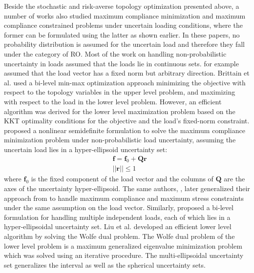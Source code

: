     Beside the stochastic and risk-averse topology optimization presented above, a number of works also studied maximum compliance minimization and maximum compliance constrained problems under uncertain loading conditions, where the former can be formulated using the latter as shown earlier. In these papers, no probability distribution is assumed for the uncertain load and therefore they fall under the category of RO. Most of the work on handling non-probabilistic uncertainty in loads assumed that the loads lie in continuous sets. \cite{Brittain2012} for example assumed that the load vector has a fixed norm but arbitrary direction. Brittain et al. used a bi-level min-max optimization approach minimizing the objective with respect to the topology variables in the upper level problem, and maximizing with respect to the load in the lower level problem. However, an efficient algorithm was derived for the lower level maximization problem based on the KKT optimality conditions for the objective and the load's fixed-norm constraint. \cite{Holmberg2015} proposed a nonlinear semidefinite formulation to solve the maximum compliance minimization problem under non-probabilistic load uncertainty, assuming the uncertain load lies in a hyper-ellipsoid uncertainty set:
    \begin{align}
      & \bm{f} = \bm{f}_0 + \bm{Q} \bm{r} \\
      & ||\bm{r}|| \leq 1
    \end{align}
    where $\bm{f}_0$ is the fixed component of the load vector and the columns of $\bm{Q}$ are the axes of the uncertainty hyper-ellipsoid. The same authors, \cite{Thore2017}, later generalized their approach from \cite{Holmberg2015} to handle maximum compliance and maximum stress constraints under the same assumption on the load vector. Similarly, \cite{Liu2018} proposed a bi-level formulation for handling multiple independent loads, each of which lies in a hyper-ellipsoidal uncertainty set. Liu et al. developed an efficient lower level algorithm by solving the Wolfe dual problem. The Wolfe dual problem of the lower level problem is a maximum generalized eigenvalue minimization problem which was solved using an iterative procedure. The multi-ellipsoidal uncertainty set generalizes the interval as well as the spherical uncertainty sets.


